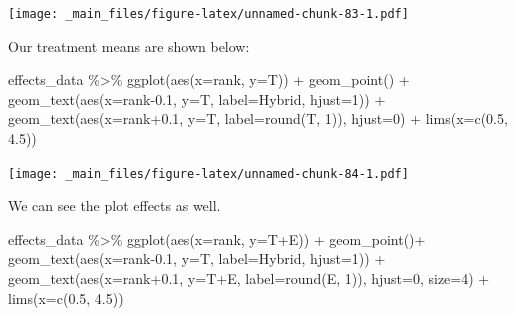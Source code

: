\documentclass[
]{book}
\newenvironment{Shaded}{\begin{snugshade}}{\end{snugshade}}
\newcommand{\AttributeTok}[1]{\textcolor[rgb]{0.77,0.63,0.00}{#1}}
\newcommand{\DecValTok}[1]{\textcolor[rgb]{0.00,0.00,0.81}{#1}}
\newcommand{\FloatTok}[1]{\textcolor[rgb]{0.00,0.00,0.81}{#1}}
\newcommand{\FunctionTok}[1]{\textcolor[rgb]{0.00,0.00,0.00}{#1}}
\newcommand{\NormalTok}[1]{#1}
\newcommand{\SpecialCharTok}[1]{\textcolor[rgb]{0.00,0.00,0.00}{#1}}
\begin{document}
\texttt{[image: \_main\_files/figure-latex/unnamed-chunk-83-1.pdf]}

Our treatment means are shown below:

\begin{Shaded}
\begin{Highlighting}[]
\NormalTok{effects\_data }\SpecialCharTok{\%\textgreater{}\%}
  \FunctionTok{ggplot}\NormalTok{(}\FunctionTok{aes}\NormalTok{(}\AttributeTok{x=}\NormalTok{rank, }\AttributeTok{y=}\NormalTok{T)) }\SpecialCharTok{+}
  \FunctionTok{geom\_point}\NormalTok{() }\SpecialCharTok{+}
  \FunctionTok{geom\_text}\NormalTok{(}\FunctionTok{aes}\NormalTok{(}\AttributeTok{x=}\NormalTok{rank}\FloatTok{{-}0.1}\NormalTok{, }\AttributeTok{y=}\NormalTok{T, }\AttributeTok{label=}\NormalTok{Hybrid, }\AttributeTok{hjust=}\DecValTok{1}\NormalTok{)) }\SpecialCharTok{+}
  \FunctionTok{geom\_text}\NormalTok{(}\FunctionTok{aes}\NormalTok{(}\AttributeTok{x=}\NormalTok{rank}\FloatTok{+0.1}\NormalTok{, }\AttributeTok{y=}\NormalTok{T, }\AttributeTok{label=}\FunctionTok{round}\NormalTok{(T, }\DecValTok{1}\NormalTok{)), }\AttributeTok{hjust=}\DecValTok{0}\NormalTok{) }\SpecialCharTok{+}
  \FunctionTok{lims}\NormalTok{(}\AttributeTok{x=}\FunctionTok{c}\NormalTok{(}\FloatTok{0.5}\NormalTok{, }\FloatTok{4.5}\NormalTok{))}
\end{Highlighting}
\end{Shaded}

\texttt{[image: \_main\_files/figure-latex/unnamed-chunk-84-1.pdf]}

We can see the plot effects as well.

\begin{Shaded}
\begin{Highlighting}[]
\NormalTok{effects\_data }\SpecialCharTok{\%\textgreater{}\%}
  \FunctionTok{ggplot}\NormalTok{(}\FunctionTok{aes}\NormalTok{(}\AttributeTok{x=}\NormalTok{rank, }\AttributeTok{y=}\NormalTok{T}\SpecialCharTok{+}\NormalTok{E)) }\SpecialCharTok{+}
  \FunctionTok{geom\_point}\NormalTok{()}\SpecialCharTok{+}
  \FunctionTok{geom\_text}\NormalTok{(}\FunctionTok{aes}\NormalTok{(}\AttributeTok{x=}\NormalTok{rank}\FloatTok{{-}0.1}\NormalTok{, }\AttributeTok{y=}\NormalTok{T, }\AttributeTok{label=}\NormalTok{Hybrid, }\AttributeTok{hjust=}\DecValTok{1}\NormalTok{)) }\SpecialCharTok{+}
  \FunctionTok{geom\_text}\NormalTok{(}\FunctionTok{aes}\NormalTok{(}\AttributeTok{x=}\NormalTok{rank}\FloatTok{+0.1}\NormalTok{, }\AttributeTok{y=}\NormalTok{T}\SpecialCharTok{+}\NormalTok{E, }\AttributeTok{label=}\FunctionTok{round}\NormalTok{(E, }\DecValTok{1}\NormalTok{)), }\AttributeTok{hjust=}\DecValTok{0}\NormalTok{, }\AttributeTok{size=}\DecValTok{4}\NormalTok{) }\SpecialCharTok{+}
  \FunctionTok{lims}\NormalTok{(}\AttributeTok{x=}\FunctionTok{c}\NormalTok{(}\FloatTok{0.5}\NormalTok{, }\FloatTok{4.5}\NormalTok{))}
\end{Highlighting}
\end{Shaded}
\end{document}
